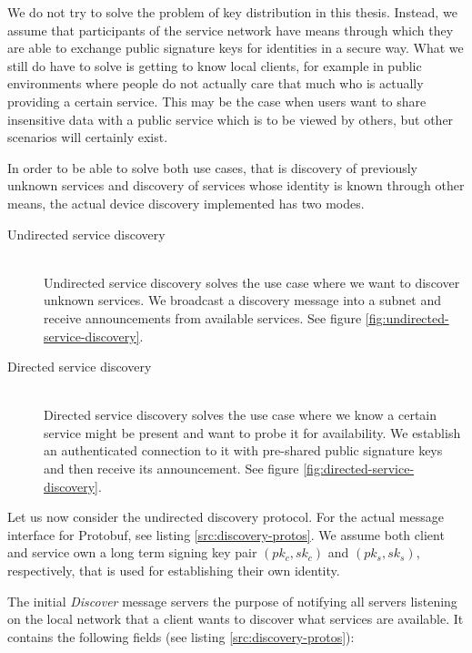 We do not try to solve the problem of key distribution in this thesis.
Instead, we assume that participants of the service network have means through which they are able to exchange public signature keys for identities in a secure way.
What we still do have to solve is getting to know local clients, for example in public environments where people do not actually care that much who is actually providing a certain service.
This may be the case when users want to share insensitive data with a public service which is to be viewed by others, but other scenarios will certainly exist.

In order to be able to solve both use cases, that is discovery of previously unknown services and discovery of services whose identity is known through other means, the actual device discovery implemented has two modes.
\begin{description}
    \item[Undirected service discovery]\hfill\\
        Undirected service discovery solves the use case where we want to discover unknown services.
        We broadcast a discovery  message into a subnet and receive announcements from available services.
        See figure \ref{fig:undirected-service-discovery}.
    \item[Directed service discovery]\hfill\\
        Directed service discovery solves the use case where we know a certain service might be present and want to probe it for availability.
        We establish an authenticated connection to it with pre-shared public signature keys and then receive its announcement.
        See figure \ref{fig:directed-service-discovery}.
\end{description}

Let us now consider the undirected discovery protocol.
For the actual message interface for Protobuf, see listing \ref{src:discovery-protos}.
We assume both client and service own a long term signing key pair $(pk_c, sk_c)$ and $(pk_s, sk_s)$, respectively, that is used for establishing their own identity.

The initial \emph{Discover} message servers the purpose of notifying all servers listening on the local network that a client wants to discover what services are available.
It contains the following fields (see listing \ref{src:discovery-protos}):

